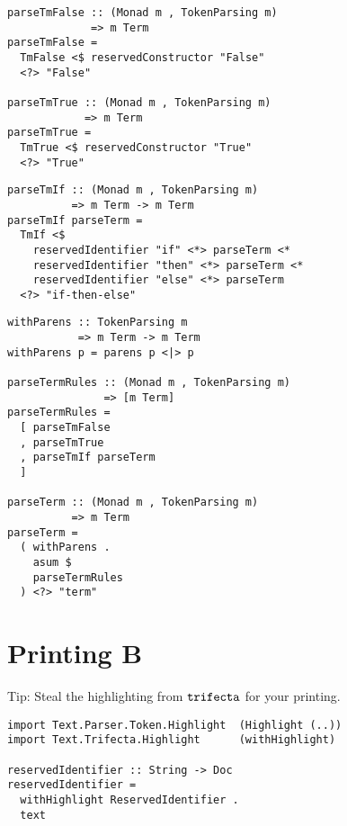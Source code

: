 \documentclass{beamer}
\begin{document}
\begin{frame}[fragile]
  \begin{verbatim}
parseTmFalse :: (Monad m , TokenParsing m)
             => m Term           
parseTmFalse =
  TmFalse <$ reservedConstructor "False"
  <?> "False"

parseTmTrue :: (Monad m , TokenParsing m)
            => m Term
parseTmTrue =
  TmTrue <$ reservedConstructor "True"
  <?> "True"
  \end{verbatim}
\end{frame} 

\begin{frame}[fragile]
  \begin{verbatim}
parseTmIf :: (Monad m , TokenParsing m)
          => m Term -> m Term
parseTmIf parseTerm =
  TmIf <$
    reservedIdentifier "if" <*> parseTerm <*
    reservedIdentifier "then" <*> parseTerm <*
    reservedIdentifier "else" <*> parseTerm
  <?> "if-then-else"
  \end{verbatim}
\end{frame} 

\begin{frame}[fragile]
  \begin{verbatim}
withParens :: TokenParsing m 
           => m Term -> m Term
withParens p = parens p <|> p

parseTermRules :: (Monad m , TokenParsing m)
               => [m Term]
parseTermRules =
  [ parseTmFalse
  , parseTmTrue
  , parseTmIf parseTerm
  ]

parseTerm :: (Monad m , TokenParsing m)
          => m Term
parseTerm =
  ( withParens .
    asum $
    parseTermRules
  ) <?> "term"
  \end{verbatim}
\end{frame} 

\section{Printing B}

\begin{frame}[fragile]
Tip: Steal the highlighting from $\tt{trifecta}$ for your printing.
  \begin{verbatim}
import Text.Parser.Token.Highlight  (Highlight (..))
import Text.Trifecta.Highlight      (withHighlight)

reservedIdentifier :: String -> Doc
reservedIdentifier =
  withHighlight ReservedIdentifier .
  text
  \end{verbatim}
\end{frame} 
\end{document}
